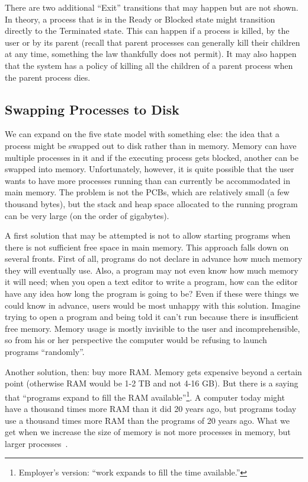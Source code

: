There are two additional ``Exit'' transitions that may happen but are not shown. In theory, a process that is in the Ready or Blocked state might transition directly to the Terminated state. This can happen if a process is killed, by the user or by its parent (recall that parent processes can generally kill their children at any time, something the law thankfully does not permit). It may also happen that the system has a policy of killing all the children of a parent process when the parent process dies.

\subsection*{Swapping Processes to Disk}
We can expand on the five state model with something else: the idea that a process might be swapped out to disk rather than in memory. Memory can have multiple processes in it and if the executing process gets blocked, another can be swapped into memory. Unfortunately, however, it is quite possible that the user wants to have more processes running than can currently be accommodated in main memory. The problem is not the PCBs, which are relatively small (a few thousand bytes), but the stack and heap space allocated to the running program can be very large (on the order of gigabytes). 

A first solution that may be attempted is not to allow starting programs when there is not sufficient free space in main memory. This approach falls down on several fronts. First of all, programs do not declare in advance how much memory they will eventually use. Also, a program may not even know how much memory it will need; when you open a text editor to write a program, how can the editor have any idea how long the program is going to be? Even if these were things we could know in advance, users would be most unhappy with this solution. Imagine trying to open a program and being told it can't run because there is insufficient free memory. Memory usage is mostly invisible to the user and incomprehensible, so from his or her perspective the computer would be refusing to launch programs ``randomly''.

Another solution, then: buy more RAM. Memory gets expensive beyond a certain point (otherwise RAM would be 1-2 TB and not 4-16 GB). But there is a saying that ``programs expand to fill the RAM available''\footnote{Employer's version: ``work expands to fill the time available.''}. A computer today might have a thousand times more RAM than it did 20 years ago, but programs today use a thousand times more RAM than the programs of 20 years ago. What we get when we increase the size of memory is not more processes in memory, but larger processes~\cite{osi}.

